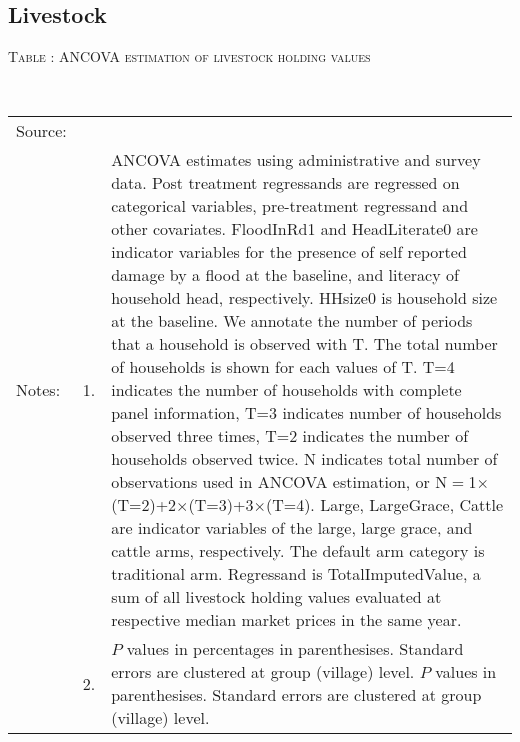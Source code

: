 \subsection{Livestock}


\hspace{-1cm}\begin{minipage}[t]{14cm}
\hfil\textsc{\normalsize Table \thetable: ANCOVA estimation of livestock holding values\label{tab ANCOVA livestock}}\\
\setlength{\tabcolsep}{1pt}
\setlength{\baselineskip}{8pt}
\renewcommand{\arraystretch}{.55}
\hfil{}\\
\renewcommand{\arraystretch}{.8}
\setlength{\tabcolsep}{1pt}
\begin{tabular}{>{\hfill\scriptsize}p{1cm}<{}>{\hfill\scriptsize}p{.25cm}<{}>{\scriptsize}p{12cm}<{\hfill}}
Source:& \multicolumn{2}{l}{\scriptsize Estimated with GUK administrative and survey data.}\\
Notes: & 1. & ANCOVA estimates using administrative and survey data. Post treatment regressands are regressed on categorical variables, pre-treatment regressand and other covariates. \textsf{FloodInRd1} and \textsf{HeadLiterate0} are indicator variables for the presence of self reported damage by a flood at the baseline, and literacy of household head, respectively. \textsf{HHsize0} is household size at the baseline. We annotate the number of periods that a household is observed with \textsf{T}. The total number of households is shown for each values of \textsf{T}. \textsf{T=4} indicates the number of households with complete panel information, \textsf{T=3} indicates number of households observed three times, \textsf{T=2} indicates the number of households observed twice. \textsf{N} indicates total number of observations used in ANCOVA estimation, or \textsf{N$=$1$\times$(T=2)+2$\times$(T=3)+3$\times$(T=4)}.  \textsf{Large}, \textsf{LargeGrace}, \textsf{Cattle} are indicator variables of the \textsf{large}, \textsf{large grace}, and \textsf{cattle} arms, respectively. The default arm category is \textsf{traditional} arm. Regressand is \textsf{TotalImputedValue}, a sum of all livestock holding values evaluated at respective median market prices in the same year. \\
& 2. & $P$ values in percentages in parenthesises. Standard errors are clustered at group (village) level.%
$P$ values in parenthesises. Standard errors are clustered at group (village) level.
\end{tabular}
\end{minipage}


